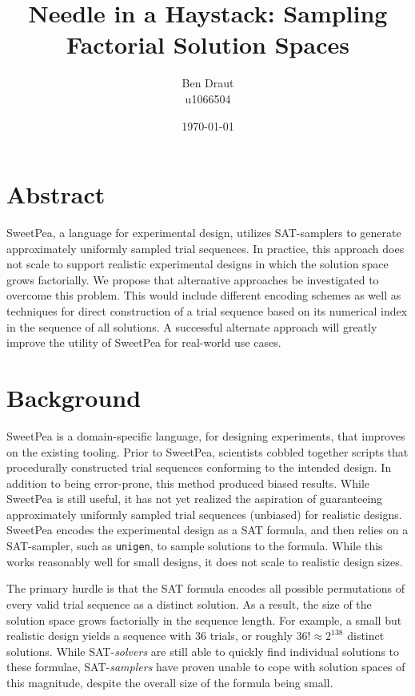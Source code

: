 \documentclass[a4paper]{article}
\title{Needle in a Haystack: Sampling Factorial Solution Spaces}
\author{Ben Draut \\ u1066504}
\date{\today}
\begin{document}
\maketitle


\section*{Abstract}

SweetPea, a language for experimental design, utilizes SAT-samplers to generate approximately uniformly sampled trial sequences. In practice, this approach does not scale to support realistic experimental designs in which the solution space grows factorially. We propose that alternative approaches be investigated to overcome this problem. This would include different encoding schemes as well as techniques for direct construction of a trial sequence based on its numerical index in the sequence of all solutions. A successful alternate approach will greatly improve the utility of SweetPea for real-world use cases.

\section*{Background}

SweetPea is a domain-specific language, for designing experiments, that improves on the existing tooling. Prior to SweetPea, scientists cobbled together scripts that procedurally constructed trial sequences conforming to the intended design. In addition to being error-prone, this method produced biased results. While SweetPea is still useful, it has not yet realized the aspiration of guaranteeing approximately uniformly sampled trial sequences (unbiased) for realistic designs. SweetPea encodes the experimental design as a SAT formula, and then relies on a SAT-sampler, such as \texttt{unigen}, to sample solutions to the formula. While this works reasonably well for small designs, it does not scale to realistic design sizes.

The primary hurdle is that the SAT formula encodes all possible permutations of every valid trial sequence as a distinct solution. As a result, the size of the solution space grows factorially in the sequence length. For example, a small but realistic design yields a sequence with $36$ trials, or roughly $36! \approx 2^{138}$ distinct solutions. While SAT-\textit{solvers} are still able to quickly find individual solutions to these formulae, SAT-\textit{samplers} have proven unable to cope with solution spaces of this magnitude, despite the overall size of the formula being small.
\end{document}
